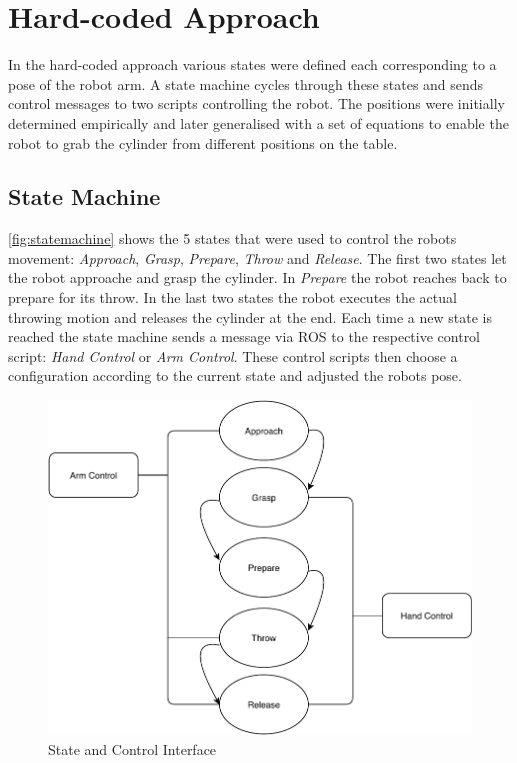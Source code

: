 \section{Hard-coded Approach}
\label{sec:hard-coded}
In the hard-coded approach various states were defined each corresponding to a pose of the robot arm.
A state machine cycles through these states and sends control messages to two scripts controlling the robot.
The positions were initially determined empirically and later generalised with a set of equations to enable the robot to grab the cylinder from different positions on the table.

\subsection{State Machine}
\autoref{fig:statemachine} shows the 5 states that were used to control the robots movement: \textit{Approach}, \textit{Grasp}, \textit{Prepare}, \textit{Throw} and \textit{Release}.
The first two states let the robot approache and grasp the cylinder.
In \textit{Prepare} the robot reaches back to prepare for its throw.
In the last two states the robot executes the actual throwing motion and releases the cylinder at the end.
Each time a new state is reached the state machine sends a message via ROS to the respective control script: \textit{Hand Control} or \textit{Arm Control}.
These control scripts then choose a configuration according to the current state and adjusted the robots pose.

\begin{figure}[tpb]
\centering
	\includegraphics[width=0.96\linewidth]{figures/state.pdf} 
	\caption{State and Control Interface}
	\vspace{-0.4cm}
	\label{fig:statemachine}
\end{figure}


